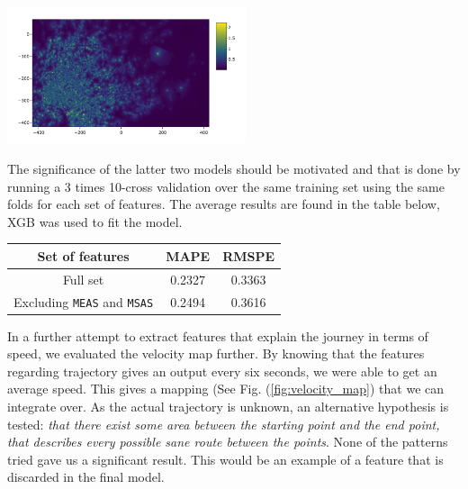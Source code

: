 \documentclass{article}
\newenvironment{Figure}
{\par\medskip\noindent\minipage{\linewidth}}
{\endminipage\par\medskip}
\begin{document}
\begin{multicols}{2}
\begin{Figure}
    \centering
    \includegraphics[width=7cm]{speed_plot.png}
    \label{fig:speed_plot}
\end{Figure}
The significance of the latter two models should be motivated and that is done by running a 3 times 10-cross validation over the same training set using the same folds for each set of features. The average results are found in the table below, XGB was used to fit the model.
\begin{center}
    \begin{tabular}{c|c|c}
         Set of features & MAPE & RMSPE \\
        \hline Full set &0.2327 &0.3363\\
        Excluding \texttt{MEAS} and \texttt{MSAS} & 0.2494 & 0.3616\\
    \end{tabular}
\end{center}

In a further attempt to extract features that explain the journey in terms of speed, we evaluated the velocity map further. By knowing that the features regarding trajectory gives an output every six seconds, we were able to get an average speed. This gives a mapping (See Fig. (\ref{fig:velocity_map}) that we can integrate over. As the actual trajectory is unknown, an alternative hypothesis is tested: \textit{that there exist some area between the starting point and the end point, that describes every possible sane route between the points}.  None of the patterns tried gave us a significant result. This would be an example of a feature that is discarded in the final model. 


\end{multicols}
\end{document}

